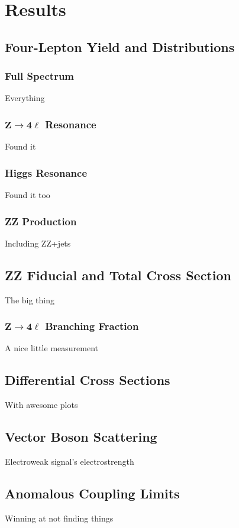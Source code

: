 
\chapter{Results}

\section{Four-Lepton Yield and Distributions}

\subsection{Full Spectrum}
Everything


\subsection[\texorpdfstring{$\mathrm{Z} \to 4\ell$}{Z to 4l} Resonance]{$\mathbf{Z} \to \mathbf{4\ell}$ Resonance}
Found it


\subsection{Higgs Resonance}
Found it too


\subsection{ZZ Production}
Including ZZ+jets



\section{ZZ Fiducial and Total Cross Section}
The big thing

\subsection[\texorpdfstring{$\mathrm{Z} \to 4\ell$}{Z to 4l} Branching  Fraction]{$\mathbf{Z} \to \mathbf{4\ell}$ Branching  Fraction}
A nice little measurement



\section{Differential Cross Sections}
With awesome plots



\section{Vector Boson Scattering}
Electroweak signal's electrostrength



\section{Anomalous Coupling Limits}
Winning at not finding things

